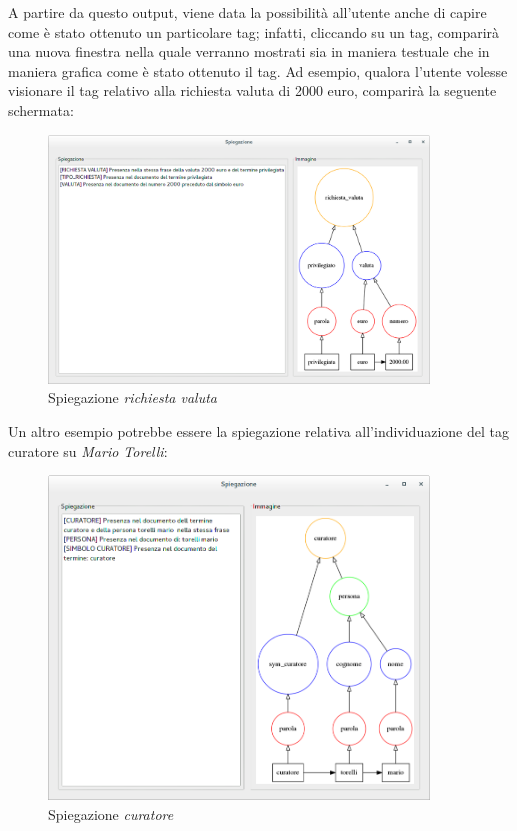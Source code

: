 A partire da questo output, viene data la possibilità all'utente anche di capire come è stato ottenuto un particolare tag; infatti, cliccando su un tag, comparirà una nuova finestra nella quale verranno mostrati sia in maniera testuale che in maniera grafica come è stato ottenuto il tag.
Ad esempio, qualora l'utente volesse visionare il tag relativo alla richiesta valuta di 2000 euro, comparirà la seguente schermata:

\begin{figure}[H]
	\centering
	\includegraphics[width=0.9\textwidth]{img/interfaces/java-richiestavaluta.png}
	\caption[Schermata java explain richiesta valuta]{Spiegazione \emph{richiesta valuta}}
	\label{java-richiestavaluta}
\end{figure}

Un altro esempio potrebbe essere la spiegazione relativa all'individuazione del tag curatore su \emph{Mario Torelli}:

\begin{figure}[H]
	\centering
	\includegraphics[width=0.9\textwidth]{img/interfaces/java-curatore.png}
	\caption[Schermata java explain curatore]{Spiegazione \emph{curatore}}
	\label{java-curatore}
\end{figure}

